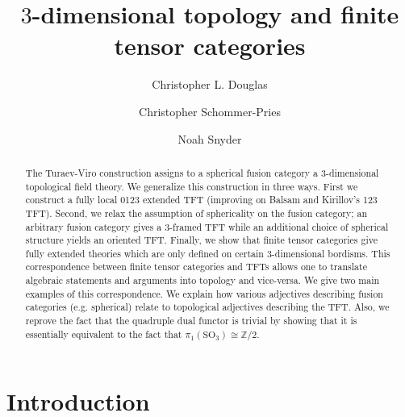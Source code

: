 \documentclass{amsart}
\begin{document}
\title{$3$-dimensional topology and finite tensor categories}

\begin{abstract}
The Turaev-Viro construction assigns to a spherical fusion category a 3-dimensional topological field theory.  We generalize this construction in three ways. First we construct a fully local 0123 extended TFT (improving on Balsam and Kirillov's 123 TFT).  Second, we relax the assumption of sphericality on the fusion category; an arbitrary fusion category gives a $3$-framed TFT while an additional choice of spherical structure yields an oriented TFT.  Finally, we show that finite tensor categories give fully extended theories which are only defined on certain $3$-dimensional bordisms.  This correspondence between finite tensor categories and TFTs allows one to translate algebraic statements and arguments into topology and vice-versa.  We give two main examples of this correspondence.  We explain how various adjectives describing fusion categories (e.g. spherical) relate to topological adjectives describing the TFT.  Also, we reprove the fact that the quadruple dual functor is trivial by showing that it is essentially equivalent to the fact that $\pi_1(\mathrm{SO}_3) \cong \mathbb{Z}/2$.
\end{abstract}
	
\author{Christopher L. Douglas}
\address{Department of Mathematics, University of California, Berkeley, CA 94720, USA}
	
\author{Christopher Schommer-Pries}
\address{Department of Mathematics \\
} %

\author{Noah Snyder}
\address{}

\maketitle	
\setcounter{tocdepth}{3}
\tableofcontents

\section{Introduction}
\end{document}
